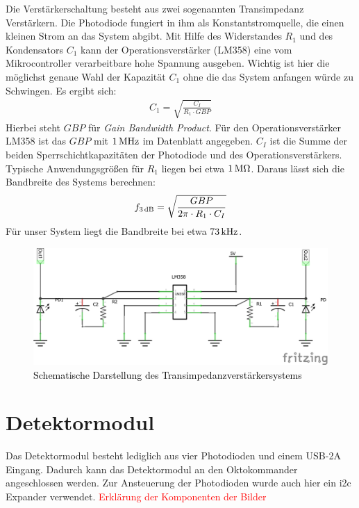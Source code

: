 Die Verstärkerschaltung besteht aus zwei sogenannten Transimpedanz Verstärkern. Die Photodiode fungiert in ihm als Konstantstromquelle, die einen kleinen Strom an das System abgibt. Mit Hilfe des Widerstandes $R_1$ und des Kondensators $C_1$ kann der Operationsverstärker (LM358) eine vom Mikrocontroller verarbeitbare hohe Spannung ausgeben. Wichtig ist hier die möglichst genaue Wahl der Kapazität $C_1$ ohne die das System anfangen würde zu Schwingen. Es ergibt sich:
\begin{align*}
	C_1 = \sqrt{\frac{C_I}{R_1 \cdot GBP}}
\end{align*}
Hierbei steht $GBP$ für \textit{Gain Bandwidth Product}. Für den Operationsverstärker LM358 ist das $GBP$ mit $\unit[1]{MHz}$ im Datenblatt angegeben. $C_I$ ist die Summe der beiden Sperrschichtkapazitäten der Photodiode und des Operationsverstärkers. Typische Anwendungsgrößen für $R_1$ liegen bei etwa $\unit[1]{M\Omega}$. Daraus lässt sich die Bandbreite des Systems berechnen:
\begin{align*}
	f_{\unit[3]{dB}} = \sqrt{\frac{GBP}{2\pi \cdot R_1 \cdot C_I}}
\end{align*}
Für unser System liegt die Bandbreite bei etwa $\unit[73]{kHz}$. 

\begin{figure}[h]
	\centering
	\includegraphics[scale=1]{../figures/Transimpedanz.png}
	\caption{\textcolor{black}{Schematische Darstellung des Transimpedanzverstärkersystems}}
	\label{fig:Transimpedanz}
\end{figure}


\section{Detektormodul}
\label{sec:Detektormodul}

Das Detektormodul besteht lediglich aus vier Photodioden und einem USB-2A Eingang. Dadurch kann das Detektormodul an den Oktokommander angeschlossen werden. Zur Ansteuerung der Photodioden wurde auch hier ein i2c Expander verwendet. 
\textcolor{red}{Erklärung der Komponenten der Bilder}

